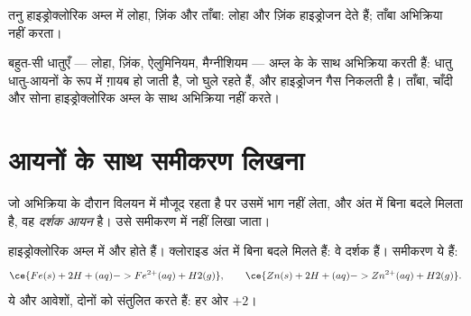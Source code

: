 \begin{omfigure}

{\small तनु हाइड्रोक्लोरिक अम्ल में लोहा, ज़िंक और ताँबा: लोहा और ज़िंक
हाइड्रोजन देते हैं; ताँबा अभिक्रिया नहीं करता।}
\end{omfigure}

\begin{proposition}[धातु और अम्ल]\label{prop:g9:metals-acids-corrosion:acid}
बहुत-सी धातुएँ --- लोहा, ज़िंक, ऐलुमिनियम, मैग्नीशियम --- अम्ल के 
 के साथ अभिक्रिया करती हैं: धातु धातु-आयनों के रूप में ग़ायब हो जाती है, जो
घुले रहते हैं, और हाइड्रोजन गैस निकलती है। ताँबा, चाँदी और सोना हाइड्रोक्लोरिक
अम्ल के साथ अभिक्रिया नहीं करते।
\end{proposition}

\section{आयनों के साथ समीकरण लिखना}

\begin{definition}[दर्शक आयन]\label{def:g9:metals-acids-corrosion:spectator}
जो  अभिक्रिया के दौरान विलयन में मौजूद रहता है पर उसमें भाग नहीं लेता, और
अंत में बिना बदले मिलता है, वह \emph{दर्शक
आयन} है। उसे समीकरण में नहीं लिखा जाता।
\end{definition}

\begin{example}[हाइड्रोक्लोरिक अम्ल में लोहा और ज़िंक]\label{ex:g9:metals-acids-corrosion:iron}
हाइड्रोक्लोरिक अम्ल में  और   होते हैं।
क्लोराइड  अंत में बिना बदले मिलते हैं: वे दर्शक हैं।
समीकरण ये हैं:
\[
  \ce{Fe(s) + 2H+(aq) -> Fe^{2+}(aq) + H2(g)}, \qquad
  \ce{Zn(s) + 2H+(aq) -> Zn^{2+}(aq) + H2(g)}.
\]
ये  और आवेशों, दोनों को संतुलित करते हैं: हर ओर $+2$।
\end{example}

